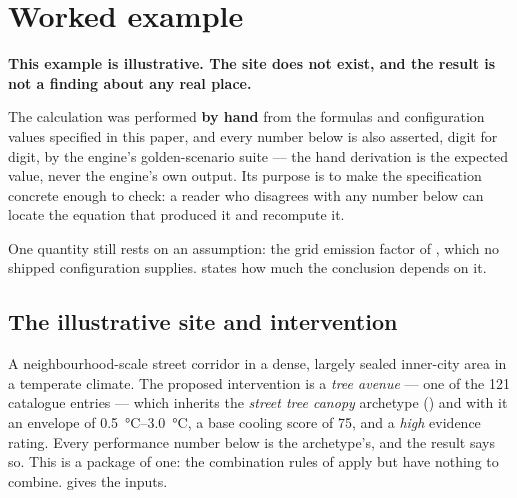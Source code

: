 \section{Worked example}
\label{sec:worked-example}

\begin{keynote}
\noindent\textbf{This example is illustrative. The site does not exist, and the
result is not a finding about any real place.}

The calculation was performed \textbf{by hand} from the formulas and
configuration values specified in this paper, and every number below is also
asserted, digit for digit, by the engine's golden-scenario suite --- the hand
derivation is the expected value, never the engine's own output. Its purpose
is to make the specification concrete enough to check: a reader who disagrees
with any number below can locate the equation that produced it and recompute
it.

One quantity still rests on an assumption: the grid emission factor of
, which no shipped configuration supplies.
 states how much the conclusion depends on it.
\end{keynote}

\subsection{The illustrative site and intervention}

A neighbourhood-scale street corridor in a dense, largely sealed inner-city
area in a temperate climate. The proposed intervention is a \emph{tree avenue}
--- one of the \num{121} catalogue entries --- which inherits the
\emph{street tree canopy} archetype () and with it an
envelope of \SIrange{0.5}{3.0}{\degreeCelsius}, a base cooling score of 75,
and a \emph{high} evidence rating. Every performance number below is the
archetype's, and the result says so. This is a package of one: the combination
rules of  apply but have nothing to combine.
 gives the inputs.

